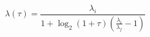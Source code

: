 \documentclass[12pt]{article}
\begin{document}
$$
  \lambda(\tau) = \frac{\lambda_i}{ 1 + \log_2(1+\tau) \left( \frac{\lambda_i}{\lambda_f} - 1 \right)}
$$
\end{document}
